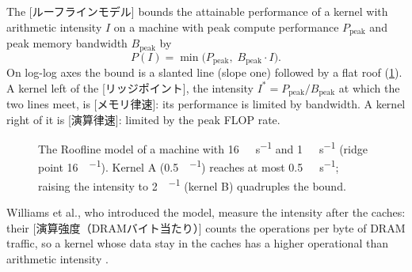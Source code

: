 \documentclass[../main.tex]{subfiles}
\begin{document}
\begin{definition}
  \label{def:l08-roofline}
  The [ルーフラインモデル] bounds the attainable
  performance of a kernel with arithmetic intensity $I$ on a machine
  with peak compute performance $P_{\text{peak}}$ and peak memory
  bandwidth $B_{\text{peak}}$ by
  \begin{equation}
    P(I) = \min\bigl(P_{\text{peak}},\; B_{\text{peak}} \cdot I\bigr).
    \label{eq:l08-roofline}
  \end{equation}
  On log-log axes the bound is a slanted line (slope one) followed by a
  flat roof (\cref{fig:l08-roofline}).  A kernel left of the
  [リッジポイント], the intensity
  $I^{*} = P_{\text{peak}}/B_{\text{peak}}$ at which the two lines meet,
  is [メモリ律速]: its performance is limited by
  bandwidth.  A kernel right of it is
  [演算律速]: limited by the peak FLOP rate.
\end{definition}

\begin{figure}[tb]
  \centering
  
  \caption{The Roofline model of a machine with
    \SI{16}{\tera\flop\per\second} and \SI{1}{\tera\byte\per\second}
    (ridge point \SI{16}{\flop\per\byte}).  Kernel A
    (\SI{0.5}{\flop\per\byte}) reaches at most \SI{0.5}{\tera\flop\per\second};
    raising the intensity to \SI{2}{\flop\per\byte} (kernel B) quadruples the
    bound.}
  \label{fig:l08-roofline}
\end{figure}

Williams et al., who introduced the model, measure the intensity
after the caches: their
[演算強度（DRAMバイト当たり）] counts the
operations per byte of DRAM traffic, so a kernel whose data stay in the
caches has a higher operational than arithmetic intensity
\cite{williams2009roofline}.
\end{document}
